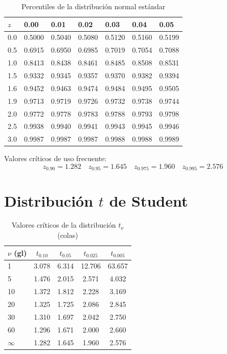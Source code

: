 \documentclass[
  10pt,           %
  twoside,        %
  openright       %
]{book}
\begin{document}
\begin{table}[H]
\centering
\caption{Percentiles de la distribución normal estándar}
\begin{tabular}{@{}lllllll@{}}
\toprule
$z$ & 0.00 & 0.01 & 0.02 & 0.03 & 0.04 & 0.05 \\
\midrule
0.0 & 0.5000 & 0.5040 & 0.5080 & 0.5120 & 0.5160 & 0.5199 \\
0.5 & 0.6915 & 0.6950 & 0.6985 & 0.7019 & 0.7054 & 0.7088 \\
1.0 & 0.8413 & 0.8438 & 0.8461 & 0.8485 & 0.8508 & 0.8531 \\
1.5 & 0.9332 & 0.9345 & 0.9357 & 0.9370 & 0.9382 & 0.9394 \\
1.6 & 0.9452 & 0.9463 & 0.9474 & 0.9484 & 0.9495 & 0.9505 \\
1.9 & 0.9713 & 0.9719 & 0.9726 & 0.9732 & 0.9738 & 0.9744 \\
2.0 & 0.9772 & 0.9778 & 0.9783 & 0.9788 & 0.9793 & 0.9798 \\
2.5 & 0.9938 & 0.9940 & 0.9941 & 0.9943 & 0.9945 & 0.9946 \\
3.0 & 0.9987 & 0.9987 & 0.9987 & 0.9988 & 0.9988 & 0.9989 \\
\bottomrule
\end{tabular}
\end{table}

\medskip
Valores críticos de uso frecuente:
\[
z_{0.90} = 1.282 \quad z_{0.95} = 1.645 \quad z_{0.975} = 1.960 \quad z_{0.995} = 2.576
\]

\section{Distribución $t$ de Student}

\begin{table}[H]
\centering
\caption{Valores críticos de la distribución $t_\nu$ (colas)}
\begin{tabular}{@{}lcccc@{}}
\toprule
$\nu$ (gl) & $t_{0.10}$ & $t_{0.05}$ & $t_{0.025}$ & $t_{0.005}$ \\
\midrule
1  & 3.078 & 6.314 & 12.706 & 63.657 \\
5  & 1.476 & 2.015 &  2.571 &  4.032 \\
10 & 1.372 & 1.812 &  2.228 &  3.169 \\
20 & 1.325 & 1.725 &  2.086 &  2.845 \\
30 & 1.310 & 1.697 &  2.042 &  2.750 \\
60 & 1.296 & 1.671 &  2.000 &  2.660 \\
$\infty$ & 1.282 & 1.645 & 1.960 & 2.576 \\
\bottomrule
\end{tabular}
\end{table}
\end{document}
